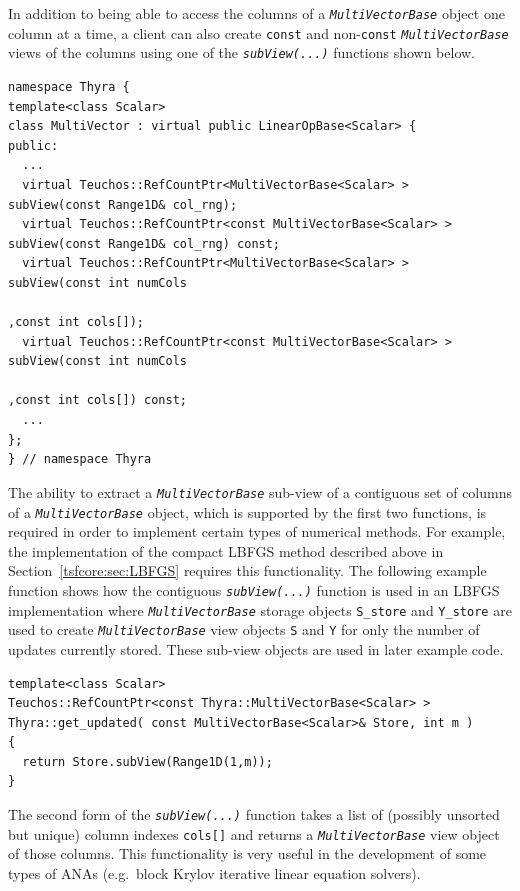 \documentclass[pdf,ps2pdf,11pt]{SANDreport}
\begin{document}
In addition to being able to access the columns of a
{}\texttt{\textit{Multi\-Vector\-Base}} object one column at a time, a client
can also create {}\texttt{const} and non-\texttt{const}
{}\texttt{\textit{Multi\-Vector\-Base}} views of the columns
using one of the {}\texttt{\textit{subView(...)}} functions shown below.

{\scriptsize\begin{verbatim}
namespace Thyra {
template<class Scalar>
class MultiVector : virtual public LinearOpBase<Scalar> {
public:
  ...
  virtual Teuchos::RefCountPtr<MultiVectorBase<Scalar> >       subView(const Range1D& col_rng);
  virtual Teuchos::RefCountPtr<const MultiVectorBase<Scalar> > subView(const Range1D& col_rng) const;
  virtual Teuchos::RefCountPtr<MultiVectorBase<Scalar> >       subView(const int numCols
                                                                        ,const int cols[]);
  virtual Teuchos::RefCountPtr<const MultiVectorBase<Scalar> > subView(const int numCols
                                                                        ,const int cols[]) const;
  ...
};
} // namespace Thyra
\end{verbatim}}

{}\noindent{}The ability to extract a {}\texttt{\textit{Multi\-Vector\-Base}}
sub-view of a contiguous set of columns of a
{}\texttt{\textit{Multi\-Vector\-Base}} object, which is supported by the
first two functions, is required in order to implement certain types of
numerical methods.  For example, the implementation of the compact LBFGS
method described above in Section~\ref{tsfcore:sec:LBFGS} requires this
functionality.  The following example function shows how the contiguous
{}\texttt{\textit{subView(...)}} function is used in an LBFGS implementation
where {}\texttt{\textit{Multi\-Vector\-Base}} storage objects
{}\texttt{S\_store} and {}\texttt{Y\_store} are used to create
{}\texttt{\textit{Multi\-Vector\-Base}} view objects {}\texttt{S} and
{}\texttt{Y} for only the number of updates currently stored.  These sub-view
objects are used in later example code.

{\scriptsize\begin{verbatim}
template<class Scalar>
Teuchos::RefCountPtr<const Thyra::MultiVectorBase<Scalar> >
Thyra::get_updated( const MultiVectorBase<Scalar>& Store, int m )
{
  return Store.subView(Range1D(1,m));
}
\end{verbatim}}

The second form of the {}\texttt{\textit{subView(...)}} function takes a
list of (possibly unsorted but unique) column indexes
{}\texttt{cols[]} and returns a {}\texttt{\textit{Multi\-Vector\-Base}} view
object of those columns.  This functionality is very useful in the
development of some types of ANAs (e.g.~block Krylov iterative linear
equation solvers).
\end{document}
